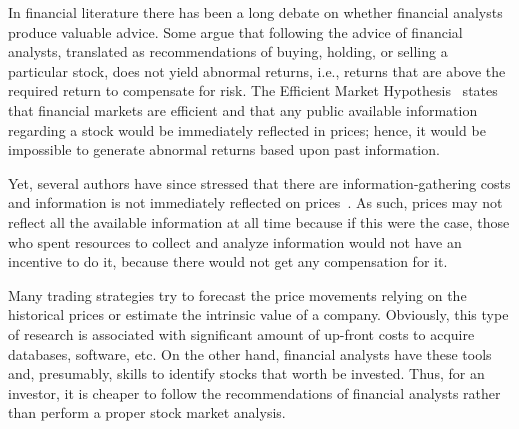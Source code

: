 \documentclass[a4paper,twoside,12pt,openright,notitlepage]{report}\usepackage[]{graphicx}\usepackage[]{color}
\begin{document}

In  financial literature there has been a long debate on whether financial analysts produce valuable  advice. Some argue that following the advice of financial analysts,  translated as recommendations of buying, holding, or selling a particular stock, does not yield  abnormal returns, i.e.,  returns that are above the required return to compensate for risk. The Efficient Market Hypothesis~\citep{fama1970ecm} states that financial markets are efficient and that any public available information  regarding a stock would be immediately reflected in prices; hence, it would be  impossible to generate abnormal returns based upon past information.

Yet, several authors have since stressed that  there are information-gathering costs and information is not immediately reflected on prices~\citep{grossman1980iie}. As such, prices may not  reflect all the available information at all time because if this were the case, those who spent resources to collect and analyze   information would not have an incentive to do it, because there would not get any compensation for it.

Many trading strategies try to forecast the price movements relying on the historical prices or estimate the intrinsic value of a company. Obviously, this type of research is associated with significant amount of up-front costs to acquire databases, software, etc. On the other hand, financial analysts have these tools and, presumably, skills to identify  stocks that worth be invested. Thus, for an investor, it is cheaper to follow the recommendations of financial analysts rather than perform a proper stock market analysis.
\end{document}
